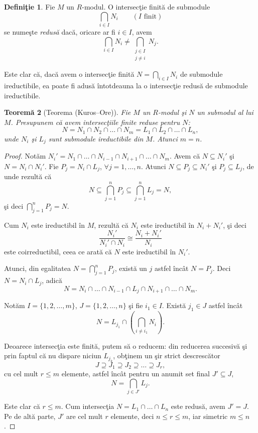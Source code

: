 \documentclass[12pt,a4paper]{book}
\theoremstyle{plain}
\newtheorem{theorem}{Teoremă}[section] %
\theoremstyle{definition}
\newtheorem{definition}[theorem]{Definiţie}
\theoremstyle{remark}
\begin{document}
\begin{definition}
Fie $M$ un $R$-modul.
O intersecţie finită de submodule
\[
\bigcap_{i \in I} N_i \qquad (I \text{ finit})
\]
se numeşte \emph{redusă} dacă, oricare ar fi $i \in I$, avem
\[
\bigcap_{i \in I} N_i \neq
\bigcap_{\substack{j \in I \\ j \neq i}} N_j .
\]

Este clar că, dacă avem o intersecţie finită
$N = \bigcap_{i \in I} N_i$ de submodule ireductibile, ea poate fi
adusă întotdeauna la o intersecţie redusă de submodule ireductibile.
\end{definition}


\begin{theorem}[Teorema (Kuros–Ore)]
Fie \(M\) un \(R\)-modul şi \(N\) un submodul al lui \(M\). Presupunem că avem
intersecţiile finite reduse pentru \(N\):
\[
N = N_1 \cap N_2 \cap \dots \cap N_m = L_1 \cap L_2 \cap \dots \cap L_n ,
\]
unde \(N_i\) şi \(L_j\) sunt submodule ireductibile din \(M\). Atunci \(m = n\).
\end{theorem}

\begin{proof}
Notăm \(N_i' = N_1 \cap \dots \cap N_{i-1} \cap N_{i+1} \cap \dots \cap N_m\).
Avem că \(N \subseteq N_i'\) şi \(N = N_i \cap N_i'\). Fie
\(P_j = N_i \cap L_j\), \(\forall j = 1,\dots,n\).
Atunci \(N \subseteq P_j \subseteq N_i'\) şi \(P_j \subseteq L_j\),
de unde rezultă că
\[
N \subseteq \bigcap_{j=1}^n P_j \subseteq \bigcap_{j=1}^n L_j = N,
\]
şi deci \(\bigcap_{j=1}^n P_j = N\).

Cum \(N_i\) este ireductibil în \(M\), rezultă că \(N_i\) este ireductibil în
\(N_i + N_i'\), şi deci
\[
\frac{N_i'}{N_i' \cap N_i} \cong \frac{N_i + N_i'}{N_i}
\]
este coirreductibil, ceea ce arată că \(N\) este ireductibil în \(N_i'\).

Atunci, din egalitatea \(N = \bigcap_{j=1}^n P_j\),
există un \(j\) astfel încât \(N = P_j\).
Deci \(N = N_i \cap L_j\), adică
\[
N = N_i \cap \dots \cap N_{i-1} \cap L_j \cap N_{i+1} \cap \dots \cap N_m.
\]

Notăm \(I = \{1,2,\dots,m\}\),
\(J = \{1,2,\dots,n\}\) şi fie \(i_1 \in I\).
Există \(j_1 \in J\) astfel încât
\[
N = L_{j_1} \cap \left(\bigcap_{i \ne i_1} N_i\right).
\]

Deoarece intersecţia este finită, putem să o reducem:
din reducerea succesivă şi prin faptul că nu dispare niciun \(L_{j_k}\),
obţinem un şir strict descrescător
\[
J \supseteq J_1 \supseteq J_2 \supseteq \dots \supseteq J_r,
\]
cu cel mult \(r\le m\) elemente,
astfel încât pentru un anumit set final \(J'\subseteq J\),
\[
N = \bigcap_{j\in J'} L_j.
\]

Este clar că \(r\le m\). Cum intersecţia \(N = L_1 \cap \dots \cap L_n\)
este redusă, avem \(J' = J\).
Pe de altă parte, \(J'\) are cel mult \(r\) elemente,
deci \(n \le r \le m\), iar simetric \(m \le n\).
\end{proof}
\end{document}
